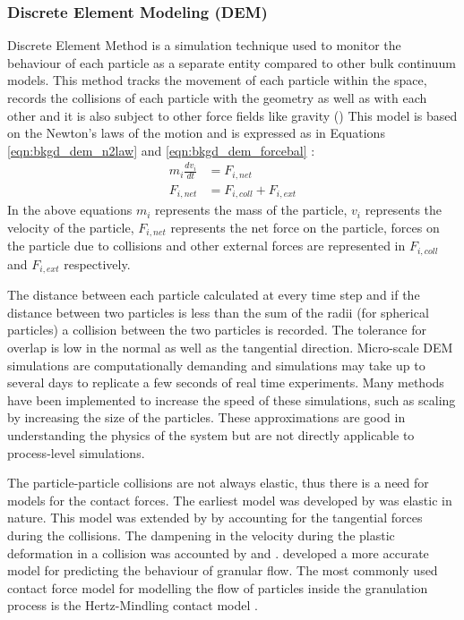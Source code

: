 \documentclass[preprint,11pt,authoryear]{elsarticle}
\begin{document}
\subsubsection{Discrete Element Modeling (DEM)}
 Discrete Element Method is a simulation technique used to monitor the behaviour of each particle 
as a separate entity compared to other bulk continuum models. This method tracks the movement of 
each particle within the space, records the collisions of each particle with the geometry as well 
as with each other and it is also subject to other force fields like gravity (\cite{Barrasso2015cerd})  This 
model is based on the Newton's laws of the motion and is expressed as in Equations 
\ref{eqn:bkgd_dem_n2law} and  \ref{eqn:bkgd_dem_forcebal} : \\
\begin{align}
m_i\frac{dv_i}{dt} &= F_{i,net} \label{eqn:bkgd_dem_n2law} \\
F_{i,net} &=  F_{i,coll} +  F_{i,ext} \label{eqn:bkgd_dem_forcebal}
\end{align}
In the above equations $m_i$ represents the mass of the particle, $v_i$ represents the velocity of 
the particle, $F_{i,net}$  represents the net force on the particle, forces on the particle due to collisions 
and other external forces are represented in $F_{i,coll}$ and $F_{i,ext}$ respectively.

The distance between each particle calculated at every time step and if the distance between two 
particles is less than the sum of the radii (for spherical particles)  a collision between the two particles 
is recorded. The tolerance for overlap is low in the normal as well as the tangential direction. 
Micro-scale DEM simulations are computationally demanding and simulations may take up to several 
days to replicate a few seconds of real time experiments. Many methods have been implemented to 
increase the speed of these simulations, such as scaling by increasing the size of the particles. These 
approximations are good in understanding the physics of the system but are not directly applicable to 
process-level simulations. 

The particle-particle collisions are not always elastic, thus there is a need for models for the 
contact forces. The earliest model was developed by \cite{hertz1882} was elastic in nature. This model was 
extended by \cite{mindlin1953} by accounting for the  tangential forces during the collisions. The dampening
in the velocity during the plastic deformation in a collision was accounted by \cite{Cundall1979} and 
\cite{walton1986}. \cite{tsuji1992} developed a more accurate model for predicting the behaviour of granular flow.
The most commonly used contact force model for modelling the flow of particles inside the granulation process 
is the Hertz-Mindling contact model \citep{gantt2006}\citep{hassanpour2013}. 
 
\end{document}
